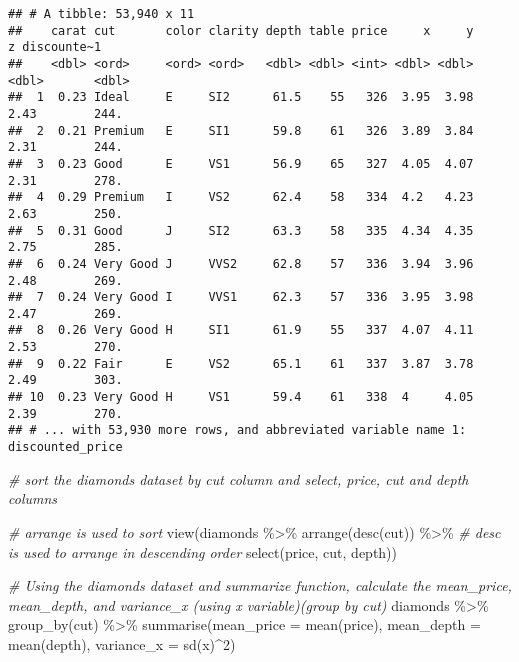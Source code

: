 \documentclass[
]{article}
\newenvironment{Shaded}{\begin{snugshade}}{\end{snugshade}}
\newcommand{\AttributeTok}[1]{\textcolor[rgb]{0.77,0.63,0.00}{#1}}
\newcommand{\CommentTok}[1]{\textcolor[rgb]{0.56,0.35,0.01}{\textit{#1}}}
\newcommand{\DecValTok}[1]{\textcolor[rgb]{0.00,0.00,0.81}{#1}}
\newcommand{\FunctionTok}[1]{\textcolor[rgb]{0.00,0.00,0.00}{#1}}
\newcommand{\NormalTok}[1]{#1}
\newcommand{\SpecialCharTok}[1]{\textcolor[rgb]{0.00,0.00,0.00}{#1}}
\begin{document}
\begin{verbatim}
## # A tibble: 53,940 x 11
##    carat cut       color clarity depth table price     x     y     z discounte~1
##    <dbl> <ord>     <ord> <ord>   <dbl> <dbl> <int> <dbl> <dbl> <dbl>       <dbl>
##  1  0.23 Ideal     E     SI2      61.5    55   326  3.95  3.98  2.43        244.
##  2  0.21 Premium   E     SI1      59.8    61   326  3.89  3.84  2.31        244.
##  3  0.23 Good      E     VS1      56.9    65   327  4.05  4.07  2.31        278.
##  4  0.29 Premium   I     VS2      62.4    58   334  4.2   4.23  2.63        250.
##  5  0.31 Good      J     SI2      63.3    58   335  4.34  4.35  2.75        285.
##  6  0.24 Very Good J     VVS2     62.8    57   336  3.94  3.96  2.48        269.
##  7  0.24 Very Good I     VVS1     62.3    57   336  3.95  3.98  2.47        269.
##  8  0.26 Very Good H     SI1      61.9    55   337  4.07  4.11  2.53        270.
##  9  0.22 Fair      E     VS2      65.1    61   337  3.87  3.78  2.49        303.
## 10  0.23 Very Good H     VS1      59.4    61   338  4     4.05  2.39        270.
## # ... with 53,930 more rows, and abbreviated variable name 1: discounted_price
\end{verbatim}

\begin{Shaded}
\begin{Highlighting}[]
\CommentTok{\# sort the diamonds dataset by cut column and select, price, cut and depth columns }

\CommentTok{\# arrange is used to sort}
\FunctionTok{view}\NormalTok{(diamonds }\SpecialCharTok{\%\textgreater{}\%}
  \FunctionTok{arrange}\NormalTok{(}\FunctionTok{desc}\NormalTok{(cut)) }\SpecialCharTok{\%\textgreater{}\%} \CommentTok{\# desc is used to arrange in descending order}
  \FunctionTok{select}\NormalTok{(price, cut, depth))}
\end{Highlighting}
\end{Shaded}

\begin{Shaded}
\begin{Highlighting}[]
\CommentTok{\# Using the diamonds dataset and summarize function, calculate the mean\_price, mean\_depth, and variance\_x (using x variable)(group by cut)}
\NormalTok{diamonds }\SpecialCharTok{\%\textgreater{}\%}
  \FunctionTok{group\_by}\NormalTok{(cut) }\SpecialCharTok{\%\textgreater{}\%}
  \FunctionTok{summarise}\NormalTok{(}\AttributeTok{mean\_price =} \FunctionTok{mean}\NormalTok{(price),}
            \AttributeTok{mean\_depth =} \FunctionTok{mean}\NormalTok{(depth),}
            \AttributeTok{variance\_x =} \FunctionTok{sd}\NormalTok{(x)}\SpecialCharTok{\^{}}\DecValTok{2}\NormalTok{)}
\end{Highlighting}
\end{Shaded}
\end{document}
